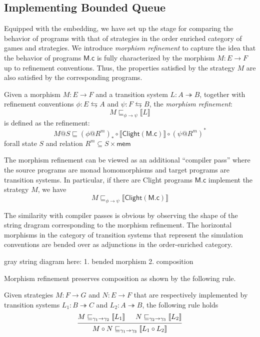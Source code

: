 \documentclass[sigplan,10pt,review,anonymous]{acmart}
\newcommand{\kw}[1]{\ensuremath{ \mathsf{#1} }}
\begin{document}
\subsection{Implementing Bounded Queue}

Equipped with the embedding, we have set up the stage for comparing the behavior
of programs with that of strategies in the order enriched category of games and
strategies. We introduce \emph{morphism refinement} to capture the idea that the
behavior of programs $\kw{M.c}$ is fully characterized by the morphism
$M: E \rightarrow F$ up to refinement conventions. Thus, the properties
satisfied by the strategy $M$ are also satisfied by the corresponding programs.

\begin{definition}
  Given a morphism $M: E \rightarrow F$ and a transition system
  $L: A \twoheadrightarrow B$, together with refinement conventions
  $\phi: E \leftrightarrows A$ and $\psi: F \leftrightarrows B$, the
  \emph{morphism refinement}:
  \[
    M \sqsubseteq_{\phi \rightarrow \psi} \llbracket L \rrbracket
  \]
  is defined as the refinement:
  \[
    M@S \sqsubseteq (\phi @ R^m)_* \circ
    \llbracket \kw{Clight}(\kw{M.c}) \rrbracket \circ (\psi @ R^m)^*
  \]
  forall state $S$ and relation $R^m \subseteq S \times \kw{mem}$
\end{definition}

The morphism refinement can be viewed as an additional ``compiler pass'' where
the source programs are monad homomorphisms and target programs are transition
systems. In particular, if there are Clight programs $\kw{M.c}$ implement the
strategy $M$, we have
\[
  M \sqsubseteq_{\phi \rightarrow \psi} \llbracket \kw{Clight}(\kw{M.c}) \rrbracket
\]

The similarity with compiler passes is obvious by
observing the shape of the string dragram corresponding to the morphism
refinement. The horizontal morphisms in the category of transition systems that
represent the simulation conventions are bended over as adjunctions in the
order-enriched category.

\begin{color}{gray}
  string diagram here: 1. bended morphism 2. composition
\end{color}

Morphism refinement preserves composition as shown by the following rule.

\begin{lemma}
  Given strategies $M: F \rightarrow G$ and $N: E \rightarrow F$ that are
  respectively implemented by transition systems $L_1: B \twoheadrightarrow C$
  and $L_2: A \twoheadrightarrow B$, the following rule holds
  \[
    \begin{prooftree}
      \hypo{M \sqsubseteq_{\gamma_1 \rightarrow \gamma_2} \llbracket L_1 \rrbracket}
      \hypo{N \sqsubseteq_{\gamma_2 \rightarrow \gamma_3} \llbracket L_2 \rrbracket}
      \infer2{M \circ N \sqsubseteq_{\gamma_1 \rightarrow \gamma_3} \llbracket L_1 \circ L_2 \rrbracket}
    \end{prooftree}
  \]
\end{lemma}
\end{document}
